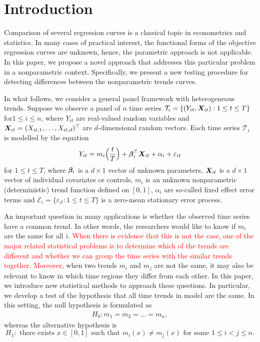 \documentclass[a4paper,12pt]{article}
\makeatletter
\renewcommand{\eqref}[1]{\tagform@{\ref{#1}}}
\makeatother
\begin{document}
%


\section{Introduction}\label{sec:intro}

Comparison of several regression curves is a classical topic in econometrics and statistics. In many cases of practical interest, the functional forms of the objective regression curves are unknown, hence, the parametric approach is not applicable. In this paper, we propose a novel approach that addresses this particular problem in a nonparametric context. Specifically, we present a new testing procedure for detecting differences between the nonparametric trends curves. 

In what follows, we consider a general panel framework with heterogeneous trends. Suppose we observe a panel of $n$ time series $\mathcal{T}_i = \{ (Y_{it},\boldsymbol{X}_{it}): 1 \le t \le T \}$ for\linebreak $1 \le i \le n$, where $Y_{it}$ are real-valued random variables and $\boldsymbol{X}_{it} = (X_{it,1},\ldots, X_{it, d})^\top$ are $d$-dimensional random vectors. Each time series $\mathcal{T}_i$ is modelled by the equation
\begin{equation}\label{eq:model}
Y_{it} = m_i \Big( \frac{t}{T} \Big) + \bm{\beta}_i^\top \boldsymbol{X}_{it} + \alpha_i + \varepsilon_{it}
\end{equation}
for $1 \le t \le T$, where $\bm{\beta}_i$ is a $d \times 1$ vector of unknown parameters, $\boldsymbol{X}_{it}$ is a $d\times 1$ vector of individual covariates or controls, $m_i$ is an unknown nonparametric (deterministic) trend function defined on $[0,1]$, $\alpha_i$ are so-called fixed effect error terms and \linebreak $\mathcal{E}_i = \{ \varepsilon_{it}: 1 \le t \le T \}$ is a zero-mean stationary error process. 


An important question in many applications is whether the observed time series have a common trend. In other words, the researchers would like to know if $m_i$ are the same for all $i$. \textcolor{red}{When there is evidence that this is not the case, one of the major related statistical problems is to determine which of the trends are different and whether we can group the time series with the similar trends together. Moreover,} when two trends $m_i$ and $m_j$ are not the same, it may also be relevant to know in which time regions they differ from each other. In this paper, we introduce new statistical methods to approach these questions. In particular, we develop a test of the hypothesis that all time trends in model \eqref{eq:model} are the same. In this setting, the null hypothesis is formulated as 
\begin{align}\label{eq:null}
H_0: m_1 = m_2 = \ldots = m_n,
\end{align}
whereas the alternative hypothesis is 
$$H_1: \text{ there exists } x\in [0, 1] \text{ such that } m_i (x) \neq m_j(x) \text{ for some } 1\leq i < j \leq n.$$
\end{document}
